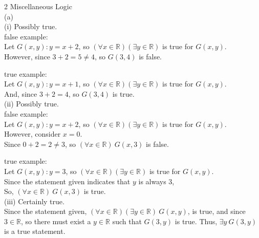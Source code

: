 \documentclass{article}
\begin{document}
{\Large 2 Miscellaneous Logic} \\[.3cm]
(a)\\

(i) Possibly true. \\[.15cm]
\indent\indent false example:\\
\indent\indent\indent\indent
Let $G(x, y): y = x + 2$, so $(\forall x\in \mathbb{R})(\exists y\in \mathbb{R})$ is true for $G(x, y)$.\\
\indent\indent\indent\indent
However, since $3 + 2 = 5 \ne 4$, so $G(3, 4)$ is false.

\indent\indent true example:\\
\indent\indent\indent\indent
Let $G(x, y): y = x + 1$, so $(\forall x\in \mathbb{R})(\exists y\in \mathbb{R})$ is true for $G(x, y)$.\\
\indent\indent\indent\indent
And, since $3 + 2 = 4$, so $G(3, 4)$ is true.\\[.15cm]

(ii) Possibly true. \\[.15cm]
\indent\indent false example:\\
\indent\indent\indent\indent
Let $G(x, y): y = x + 2$, so $(\forall x\in \mathbb{R})(\exists y\in\mathbb{R})$ is true for $G(x, y)$.\\
\indent\indent\indent\indent
However, consider $x = 0$.\\
\indent\indent\indent\indent
Since $0 + 2 = 2 \ne 3$, so $(\forall x\in\mathbb{R})\ G(x, 3)$ is false.

\indent\indent true example:\\
\indent\indent\indent\indent
Let $G(x, y): y = 3$, so $(\forall x\in \mathbb{R})(\exists y\in \mathbb{R})$ is true for $G(x, y)$.\\
\indent\indent\indent\indent
Since the statement given indicates that $y$ is always 3,\\
\indent\indent\indent\indent
So, $(\forall x\in\mathbb{R})\ G(x, 3)$ is true. \\[.15cm]

(iii) Certainly true. \\[.15cm]
\indent\indent
Since the statement given, $(\forall x\in \mathbb{R})(\exists y\in \mathbb{R})\ G(x, y)$, is true, and since\\
\indent
$3\in\mathbb{R}$, so there must exist a $y\in\mathbb{R}$ such that $G(3, y)$ is true. Thus, $\exists y\ G(3,y)$\\
\indent
is a true statement.\\[.15cm]
\end{document}
